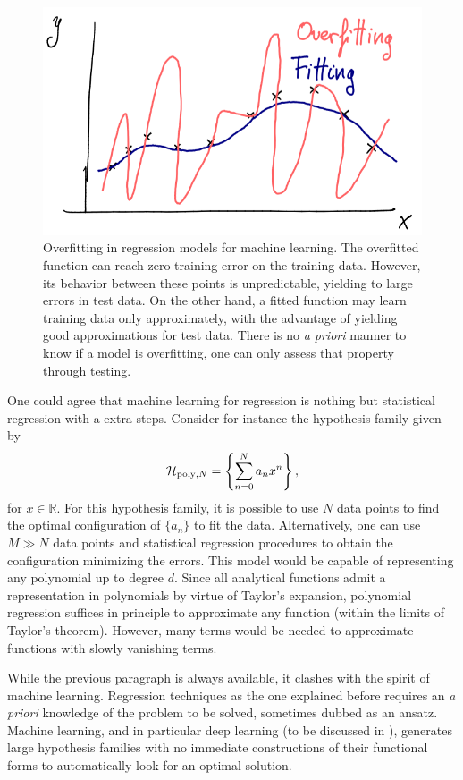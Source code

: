 \documentclass[]{report}
\begin{document}
\begin{figure}
\centering
\includegraphics[width = \linewidth]{images/overfitting}
\caption{Overfitting in regression models for machine learning. The overfitted function can reach zero training error on the training data. However, its behavior between these points is unpredictable, yielding to large errors in test data. On the other hand, a fitted function may learn training data only approximately, with the advantage of yielding good approximations for test data. There is no \textit{a priori} manner to know if a model is overfitting, one can only assess that property through testing.}
\end{figure}

One could agree that machine learning for regression is nothing but statistical regression with a extra steps. Consider for instance the hypothesis family given by
\begin{equation}
\mathcal H_{{\rm poly}, N} = \left\{ \sum_{n = 0}^N a_n x^n \right\}, 
\end{equation}
for $x \in \mathbb R$. For this hypothesis family, it is possible to use $N$ data points to find the optimal configuration of $\{ a_n\}$ to fit the data. Alternatively, one can use $M \gg N$ data points and statistical regression procedures to obtain the configuration minimizing the errors. This model would be capable of representing any polynomial up to degree $d$. Since all analytical functions admit a representation in polynomials by virtue of Taylor's expansion, polynomial regression suffices in principle to approximate any function (within the limits of Taylor's theorem). However, many terms would be needed to approximate functions with slowly vanishing terms. 

While the previous paragraph is always available, it clashes with the spirit of machine learning. Regression techniques as the one explained before requires an \textit{a priori} knowledge of the problem to be solved, sometimes dubbed as an ansatz. Machine learning, and in particular deep learning (to be discussed in ), generates large hypothesis families with no immediate constructions of their functional forms to automatically look for an optimal solution. 
\end{document}
